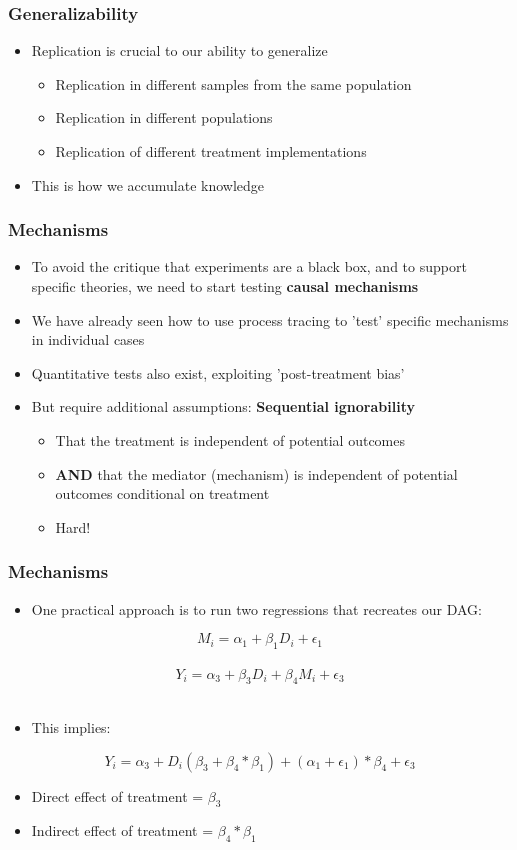 \documentclass[xcolor=x11names,compress]{beamer}\usepackage[]{graphicx}\usepackage[]{color}
\renewcommand{\(}{\begin{columns}}
\renewcommand{\)}{\end{columns}}
\newcommand{\<}[1]{\begin{column}{#1}}
\renewcommand{\>}{\end{column}}
\begin{document}
\begin{frame}
\frametitle{Generalizability}
\begin{itemize}
\item Replication is crucial to our ability to generalize
\pause
\begin{itemize}
\item Replication in different samples from the same population
\pause
\item Replication in different populations
\pause
\item Replication of different treatment implementations
\end{itemize}
\item This is how we accumulate knowledge
\end{itemize}
\end{frame}

\begin{frame}
\frametitle{Mechanisms}
\begin{itemize}
\item To avoid the critique that experiments are a black box, and to support specific theories, we need to start testing \textbf{causal mechanisms}
\pause
\item We have already seen how to use process tracing to 'test' specific mechanisms in individual cases
\pause
\item Quantitative tests also exist, exploiting 'post-treatment bias'
\pause
\item But require additional assumptions: \textbf{Sequential ignorability}
\begin{itemize}
\item That the treatment is independent of potential outcomes
\pause
\item \textbf{AND} that the mediator (mechanism) is independent of potential outcomes conditional on treatment
\pause
\item Hard!
\end{itemize}
\end{itemize}
\end{frame}

\begin{frame}
\frametitle{Mechanisms}
\begin{itemize}
\item One practical approach is to run two regressions that recreates our DAG:
\end{itemize}
$$M_i = \alpha_1 + \beta_1 D_i + \epsilon_1$$ \\
$$Y_i = \alpha_3 + \beta_3 D_i + \beta_4 M_i + \epsilon_3$$ \\
\begin{itemize}
\item This implies:
\end{itemize}
$$Y_i = \alpha_3 + D_i (\beta_3+\beta_4*\beta_1) + (\alpha_1 +\epsilon_1)*\beta_4 + \epsilon_3$$
\pause
\begin{itemize}
\item Direct effect of treatment = $\beta_3$
\pause
\item Indirect effect of treatment = $\beta_4*\beta_1$
\end{itemize}
\end{frame}
\end{document}
